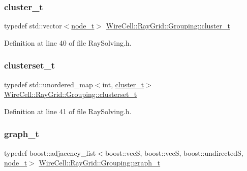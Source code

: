 \subsubsection{\texorpdfstring{cluster\+\_\+t}{cluster\_t}}
{\footnotesize\ttfamily typedef std\+::vector$<$\hyperlink{struct_wire_cell_1_1_ray_grid_1_1_grouping_1_1node__t}{node\+\_\+t}$>$ \hyperlink{class_wire_cell_1_1_ray_grid_1_1_grouping_a97df53c020a311ad1fccc395195fcd88}{Wire\+Cell\+::\+Ray\+Grid\+::\+Grouping\+::cluster\+\_\+t}}



Definition at line 40 of file Ray\+Solving.\+h.

\mbox{\label{class_wire_cell_1_1_ray_grid_1_1_grouping_a0a4ee47c906176803dd7b3e42803d0ed}} 
\subsubsection{\texorpdfstring{clusterset\+\_\+t}{clusterset\_t}}
{\footnotesize\ttfamily typedef std\+::unordered\+\_\+map$<$int, \hyperlink{class_wire_cell_1_1_ray_grid_1_1_grouping_a97df53c020a311ad1fccc395195fcd88}{cluster\+\_\+t}$>$ \hyperlink{class_wire_cell_1_1_ray_grid_1_1_grouping_a0a4ee47c906176803dd7b3e42803d0ed}{Wire\+Cell\+::\+Ray\+Grid\+::\+Grouping\+::clusterset\+\_\+t}}



Definition at line 41 of file Ray\+Solving.\+h.

\mbox{\label{class_wire_cell_1_1_ray_grid_1_1_grouping_a9db75b60d59cf5af39e5957af343b5d7}} 
\subsubsection{\texorpdfstring{graph\+\_\+t}{graph\_t}}
{\footnotesize\ttfamily typedef boost\+::adjacency\+\_\+list$<$boost\+::vecS, boost\+::vecS, boost\+::undirectedS, \hyperlink{struct_wire_cell_1_1_ray_grid_1_1_grouping_1_1node__t}{node\+\_\+t}$>$ \hyperlink{class_wire_cell_1_1_ray_grid_1_1_grouping_a9db75b60d59cf5af39e5957af343b5d7}{Wire\+Cell\+::\+Ray\+Grid\+::\+Grouping\+::graph\+\_\+t}}



